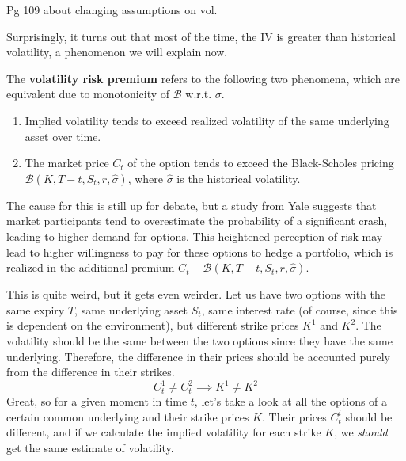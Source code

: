 \documentclass{article}
\begin{document}
    \begin{question}[Natenberg]
      Pg 109 about changing assumptions on vol. 
    \end{question}

    Surprisingly, it turns out that most of the time, the IV is greater than historical volatility, a phenomenon we will explain now. 

    \begin{definition}
      The \textbf{volatility risk premium} refers to the following two phenomena, which are equivalent due to monotonicity of $\mathcal{B}$ w.r.t. $\sigma$. 
      \begin{enumerate}
        \item Implied volatility tends to exceed realized volatility of the same underlying asset over time. 
        \item The market price $C_t$ of the option tends to exceed the Black-Scholes pricing $\mathcal{B}(K, T - t, S_t, r, \hat{\sigma})$, where $\hat{\sigma}$ is the historical volatility. 
      \end{enumerate}
    \end{definition}

    The cause for this is still up for debate, but a study from Yale suggests that market participants tend to overestimate the probability of a significant crash, leading to higher demand for options. This heightened perception of risk may lead to higher willingness to pay for these options to hedge a portfolio, which is realized in the additional premium $C_t - \mathcal{B}(K, T - t, S_t, r, \hat{\sigma})$. 

    This is quite weird, but it gets even weirder. Let us have two options with the same expiry $T$, same underlying asset $S_t$, same interest rate (of course, since this is dependent on the environment), but different strike prices $K^1$ and $K^2$. The volatility should be the same between the two options since they have the same underlying. Therefore, the difference in their prices should be accounted purely from the difference in their strikes. 
    \begin{equation}
      C_t^1 \neq C_t^2 \implies K^1 \neq K^2
    \end{equation}
    Great, so for a given moment in time $t$, let's take a look at all the options of a certain common underlying and their strike prices $K$. Their prices $C_t^i$ should be different, and if we calculate the implied volatility for each strike $K$, we \textit{should} get the same estimate of volatility. 
\end{document}
